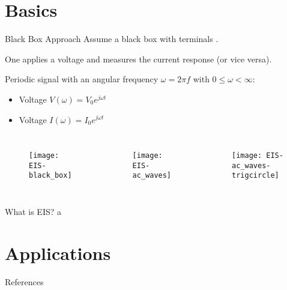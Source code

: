 \documentclass[10pt,compress,handout]{beamer}
\begin{document}
\section{Basics}
    \begin{frame}{Black Box Approach}
        Assume a black box with terminals .

        One applies a voltage and measures the current response (or vice versa).

        Periodic signal with an angular frequency $\omega = 2\pi f$
        with $0 \le \omega < \infty$:
        \begin{itemize}
            \item Voltage $V(\omega) = V_0 e^{j \omega t}$  
            \item Voltage $I(\omega) = I_0 e^{j \omega t}$  
        \end{itemize}
        
        \begin{columns}
            \centering
            \centering
                \begin{figure}[h]
                    \texttt{[image: EIS-black\_box]}
                \end{figure}
            \centering
                \begin{figure}
                    \texttt{[image: EIS-ac\_waves]}
                \end{figure}
            \centering
                \begin{figure}
                    \texttt{[image: EIS-ac\_waves-trigcircle]}
                \end{figure}
        \end{columns}
    \end{frame}
    
    \begin{frame}{What is EIS?}
    a
    \end{frame}


\section{Applications}

\begin{frame}[allowframebreaks=0.9]{References}
\AtNextBibliography{\tiny}
\printbibliography
\end{frame}
\end{document}
